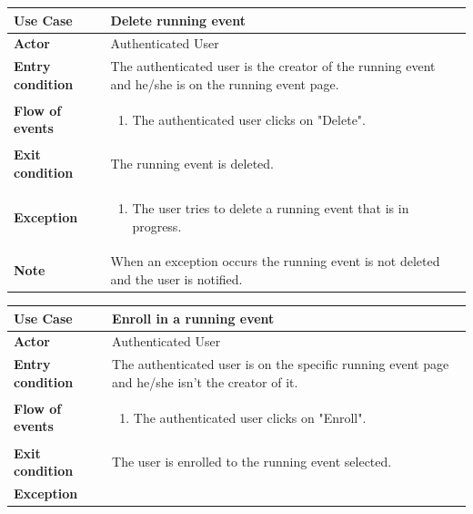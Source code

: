 \documentclass[../main.tex]{subfiles}
\begin{document}
	\vspace*{3cm}
	\begin{center}
		\begin{tabular}{p{3cm}p{8.28cm}}
			\hline
			\textbf{Use Case} & Delete running event\\
			\hline
			\textbf{Actor} & Authenticated User\\
			\hline
			\textbf{Entry condition} & The authenticated user is the creator of the running event and he/she is on the running event page.\\
			\hline
			\textbf{Flow of events} & \begin{enumerate}
				\linespread{0}\item The authenticated user clicks on "Delete".
			\end{enumerate}\\
			\hline
			\textbf{Exit condition} & The running event is deleted.\\
			\hline
			\textbf{Exception}& \begin{enumerate}
				\linespread{0}\item The user tries to delete a running event that is in progress.
			\end{enumerate}\\
			\hline
			\textbf{Note} & When an exception occurs the running event is not deleted and the user is notified.\\
			\hline
		\end{tabular}
	\end{center}
	\vspace*{3cm}
	\begin{center}
		\begin{tabular}{p{3cm}p{8.28cm}}
			\hline
			\textbf{Use Case} & Enroll in a running event\\
			\hline
			\textbf{Actor} & Authenticated User\\
			\hline
			\textbf{Entry condition} & The authenticated user is on the specific running event page and he/she isn't the creator of it.\\
			\hline
			\textbf{Flow of events} & \begin{enumerate}
				\linespread{0}\item The authenticated user clicks on "Enroll".
			\end{enumerate}\\
			\hline
			\textbf{Exit condition} & The user is enrolled to the running event selected.\\
			\hline
			\textbf{Exception}\\
			\hline
		\end{tabular}
	\end{center}
\end{document}
